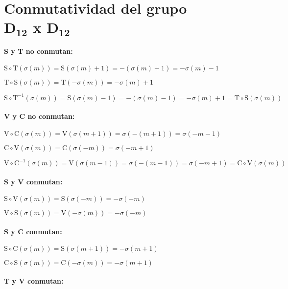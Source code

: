 	\chapter[Conmutatividad del grupo D$_{\textbf{12}}$ x D$_{\textbf{12}}$]{Conmutatividad del grupo \\D$_{\textbf{12}}$ x D$_{\textbf{12}}$}
	\label{app:commm}
		\subsubsection*{S y T no conmutan:}
		
		$\text{S}\circ\text{T}(\sigma(m))=\text{S}(\sigma(m)+1)=-(\sigma(m)+1)=-\sigma(m)-1$
		
		$\text{T}\circ\text{S}(\sigma(m))=\text{T}(-\sigma(m))=-\sigma(m)+1$
		
		$\text{S}\circ\text{T}^{-1}(\sigma(m))=\text{S}(\sigma(m)-1)=-(\sigma(m)-1)=-\sigma(m)+1=\text{T}\circ\text{S}(\sigma(m))$
		
		\subsubsection*{V y C no conmutan:}
		
		$\text{V}\circ\text{C}(\sigma(m))=\text{V}(\sigma(m+1))=\sigma(-(m+1))=\sigma(-m-1)$
		
		$\text{C}\circ\text{V}(\sigma(m))=\text{C}(\sigma(-m))=\sigma(-m+1)$
		
		$\text{V}\circ\text{C}^{-1}(\sigma(m))=\text{V}(\sigma(m-1))=\sigma(-(m-1))=\sigma(-m+1)=\text{C}\circ\text{V}(\sigma(m))$
		
		\subsubsection*{S y V conmutan:}
		
		$\text{S}\circ\text{V}(\sigma(m))=\text{S}(\sigma(-m))=-\sigma(-m)$
		
		$\text{V}\circ\text{S}(\sigma(m))=\text{V}(-\sigma(m))=-\sigma(-m)$
		
		\subsubsection*{S y C conmutan:}
		
		$\text{S}\circ\text{C}(\sigma(m))=\text{S}(\sigma(m+1))=-\sigma(m+1)$
		
		$\text{C}\circ\text{S}(\sigma(m))=\text{C}(-\sigma(m))=-\sigma(m+1)$
		
		\subsubsection*{T y V conmutan:}
		
